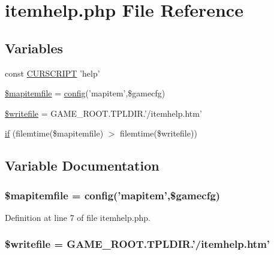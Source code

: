 \hypertarget{itemhelp_8php}{\section{itemhelp.\+php File Reference}
\label{itemhelp_8php}
}
\subsection*{Variables}
\begin{DoxyCompactItemize}
\item 
const \hyperlink{itemhelp_8php_a39c39f525eceb86cabc338804f230e80}{C\+U\+R\+S\+C\+R\+I\+P\+T} 'help'
\item 
\hyperlink{itemhelp_8php_a7d4a07d88fbf7598d1afe480b8e49aff}{\$mapitemfile} = \hyperlink{global_8func_8php_a239de3ed26da8daceb8acacdcb03325d}{config}('mapitem',\$gamecfg)
\item 
\hyperlink{itemhelp_8php_a7f36146362433df71ca7f7102705501a}{\$writefile} = G\+A\+M\+E\+\_\+\+R\+O\+O\+T.\+T\+P\+L\+D\+I\+R.'/itemhelp.\+htm'
\item 
\hyperlink{itemhelp_8php_a46cd93534aef9d931d66996d75a1dc4f}{if} (filemtime(\$mapitemfile) $>$ filemtime(\$writefile))
\end{DoxyCompactItemize}


\subsection{Variable Documentation}
\hypertarget{itemhelp_8php_a7d4a07d88fbf7598d1afe480b8e49aff}{
\subsubsection[{\$mapitemfile}]{\setlength{\rightskip}{0pt plus 5cm}\$mapitemfile = {\bf config}('mapitem',\$gamecfg)}}\label{itemhelp_8php_a7d4a07d88fbf7598d1afe480b8e49aff}


Definition at line 7 of file itemhelp.\+php.

\hypertarget{itemhelp_8php_a7f36146362433df71ca7f7102705501a}{
\subsubsection[{\$writefile}]{\setlength{\rightskip}{0pt plus 5cm}\$writefile = G\+A\+M\+E\+\_\+\+R\+O\+O\+T.\+T\+P\+L\+D\+I\+R.'/itemhelp.\+htm'}}\label{itemhelp_8php_a7f36146362433df71ca7f7102705501a}


